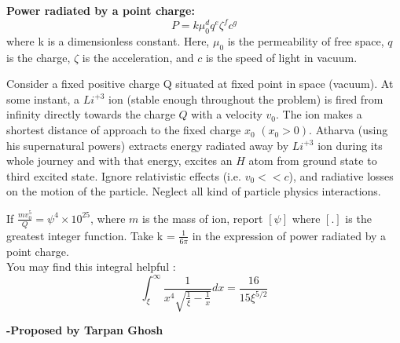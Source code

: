 \documentclass[11pt,a4paper]{scrartcl}
\begin{document}
\begin{problem}





\textbf{Power radiated by a point charge:}
$$P= k \mu_{0}^{d} q^e \zeta^f c^g$$ where k is a dimensionless constant. Here, $\mu_0$ is the permeability of free space, $q$ is the charge, $\zeta$ is the acceleration, and $c$ is the speed of light in vacuum.


Consider a fixed positive charge Q situated at fixed point in space (vacuum). At some instant, a $Li^{+3}$ ion (stable enough throughout the problem) is fired from infinity directly towards the charge $Q$ with a velocity $v_0$. The ion makes a shortest distance of approach to the fixed charge $x_0$ $(x_0 > 0)$.
Atharva (using his supernatural powers) extracts energy radiated away by $Li^{+3}$ ion during its whole journey and with that energy, excites an $H$ atom from ground state to third excited state. 
Ignore relativistic effects (i.e. $v_0 << c$), and radiative losses on the motion of the particle. Neglect all kind of particle physics interactions. 

If $\frac{mv_{0}^5}{Q} = \psi^4 \times 10^{25}$, where $m$ is the mass of ion, report $[\psi]$ where $[.]$ is the greatest integer function.
Take k = $\frac{1}{6 \pi}$ in the expression of power radiated by a point charge. \\
 You may find this integral helpful : 
$$\int_{\xi}^{\infty} \frac{1}{x^4 \sqrt{\frac{1}{\xi} - \frac{1}{x}}} dx = \frac{16}{15 \xi^{5/2}}$$
\end{problem}
\begin{flushright}
\textbf{\Large{-Proposed by Tarpan Ghosh}}
\end{flushright}
\end{document}
